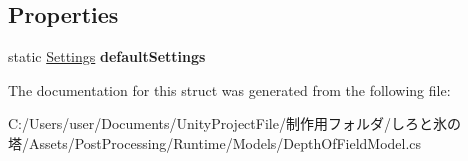 \subsection*{Properties}
\begin{DoxyCompactItemize}
\item 
\mbox{\label{struct_unity_engine_1_1_post_processing_1_1_depth_of_field_model_1_1_settings_a33cabc314b2e0327ed8a4927d61d4feb}} 
static \hyperlink{struct_unity_engine_1_1_post_processing_1_1_depth_of_field_model_1_1_settings}{Settings} {\bfseries default\+Settings}
\end{DoxyCompactItemize}


The documentation for this struct was generated from the following file\+:\begin{DoxyCompactItemize}
\item 
C\+:/\+Users/user/\+Documents/\+Unity\+Project\+File/制作用フォルダ/しろと氷の塔/\+Assets/\+Post\+Processing/\+Runtime/\+Models/Depth\+Of\+Field\+Model.\+cs\end{DoxyCompactItemize}
